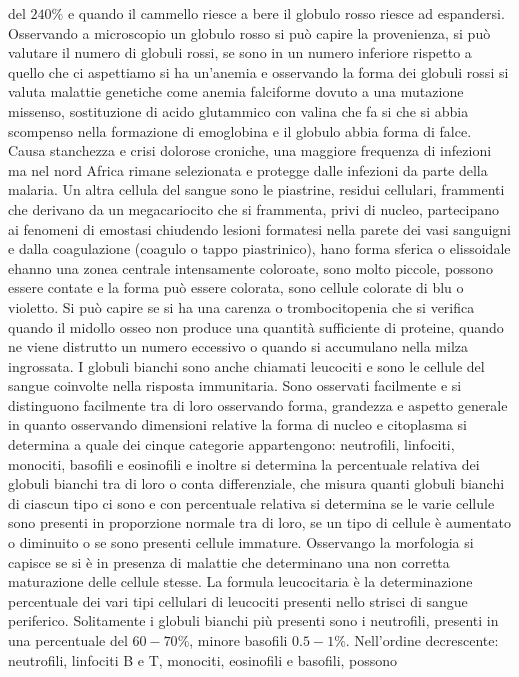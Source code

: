 del $240\%$ e quando il cammello riesce a bere il globulo rosso riesce ad espandersi. Osservando a microscopio un globulo rosso si pu\`o capire la provenienza, si pu\`o valutare il 
numero di globuli rossi, se sono in un numero inferiore rispetto a quello che ci aspettiamo si ha un'anemia e osservando la forma dei globuli rossi si valuta malattie genetiche come
anemia falciforme dovuto a una mutazione missenso, sostituzione di acido glutammico con valina che fa si che si abbia scompenso nella formazione di emoglobina e il globulo abbia forma
di falce. Causa stanchezza e crisi dolorose croniche, una maggiore frequenza di infezioni ma nel nord Africa rimane selezionata e protegge dalle infezioni da parte della malaria. Un
altra cellula del sangue sono le piastrine, residui cellulari, frammenti che derivano da un megacariocito che si frammenta, privi di nucleo, partecipano ai fenomeni di emostasi chiudendo
lesioni formatesi nella parete dei vasi sanguigni e dalla coagulazione (coagulo o tappo piastrinico), hano forma sferica o elissoidale ehanno una zonea centrale intensamente coloroate, 
sono molto piccole, possono essere contate e la forma pu\`o essere colorata, sono cellule colorate di blu o violetto. Si pu\`o capire se si ha una carenza o trombocitopenia che si 
verifica quando il midollo osseo non produce una quantit\`a sufficiente di proteine, quando ne viene distrutto un numero eccessivo o quando si accumulano nella milza ingrossata. I
globuli bianchi sono anche chiamati leucociti e sono le cellule del sangue coinvolte nella risposta immunitaria. Sono osservati facilmente e si distinguono facilmente tra di loro
osservando forma, grandezza e aspetto generale in quanto osservando dimensioni relative la forma di nucleo e citoplasma si determina a quale dei cinque categorie appartengono: 
neutrofili, linfociti, monociti, basofili e eosinofili e inoltre si determina la percentuale relativa dei globuli bianchi tra di loro o conta differenziale, che misura quanti
globuli bianchi di ciascun tipo ci sono e con percentuale relativa si determina se le varie cellule sono presenti in proporzione normale tra di loro, se un tipo di cellule \`e aumentato
o diminuito o se sono presenti cellule immature. Osservango la morfologia si capisce se si \`e in presenza di malattie che determinano una non corretta maturazione delle cellule stesse.
La formula leucocitaria \`e la determinazione percentuale dei vari tipi cellulari di leucociti presenti nello strisci di sangue periferico. Solitamente i globuli bianchi pi\`u presenti
sono i neutrofili, presenti in una percentuale del $60-70\%$, minore basofili $0.5-1\%$. Nell'ordine decrescente: neutrofili, linfociti B e T, monociti, eosinofili e basofili, possono
